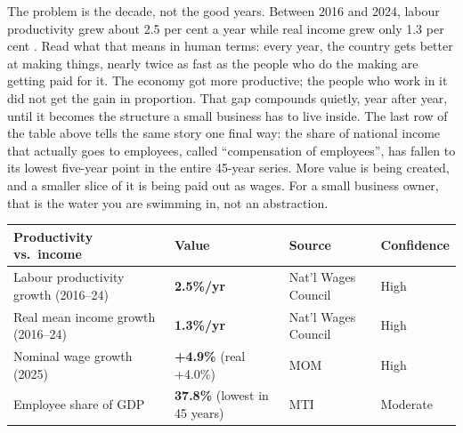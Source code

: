 \documentclass[10pt,twoside,openany]{memoir}
\renewcommand{\arraystretch}{1.1}
\begin{document}
{The problem is the decade, not the good years. Between 2016 and 2024,
labour productivity grew about 2.5 per cent a year while real income
grew only 1.3 per cent \cite{mom-wages}. Read what that means in human
terms: every year, the country gets better at making things, nearly
twice as fast as the people who do the making are getting paid for it.
The economy got more productive; the people who work in it did not get
the gain in proportion. That gap compounds quietly, year after year,
until it becomes the structure a small business has to live inside. The
last row of the table above tells the same story one final way: the
share of national income that actually goes to employees, called
``compensation of employees'', has fallen to its lowest five-year point
in the entire 45-year series. More value is being created, and a smaller
slice of it is being paid out as wages. For a small business owner, that
is the water you are swimming in, not an abstraction.

{\def\LTcaptype{none} %
{\renewcommand{\arraystretch}{0.9}\begin{longtable}[]{@{}
  >{\raggedright\arraybackslash}p{}
  >{\raggedright\arraybackslash}p{}
  >{\raggedright\arraybackslash}p{}
  >{\raggedright\arraybackslash}p{}@{}}
\toprule\noalign{}
\begin{minipage}[b]{\linewidth}\raggedright
Productivity vs.~income
\end{minipage} & \begin{minipage}[b]{\linewidth}\raggedright
Value
\end{minipage} & \begin{minipage}[b]{\linewidth}\raggedright
Source
\end{minipage} & \begin{minipage}[b]{\linewidth}\raggedright
Confidence
\end{minipage} \\
\midrule\noalign{}
\endhead
\bottomrule\noalign{}
\endlastfoot
Labour productivity growth (2016--24) & \textbf{2.5\%/yr} & Nat'l Wages
Council & High \\
Real mean income growth (2016--24) & \textbf{1.3\%/yr} & Nat'l Wages
Council & High \\
Nominal wage growth (2025) & \textbf{+4.9\%} (real +4.0\%) & MOM &
High \\
Employee share of GDP & \textbf{37.8\%} (lowest in 45 years) & MTI &
Moderate \\
\end{longtable}
}

}}
\end{document}
